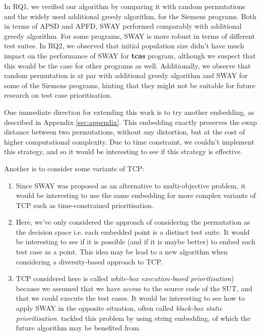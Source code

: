 \documentclass[10pt,journal,compsoc]{IEEEtran}
\begin{document}
	In RQ1, we verified our algorithm by comparing it with random permutations and the widely used additional greedy algorithm, for the Siemens programs. Both in terms of APSD and APFD, SWAY performed comparably with additional greedy algorithm. For some programs, SWAY is more robust in terms of different test suites.
	In RQ2, we observed that initial population size didn't have much impact on the performance of SWAY for {\bf tcas} program, although we suspect that this would be the case for other programs as well.
	Additionally, we observe that random permutation is at par with additional greedy algorithm and SWAY for some of the Siemens programs, hinting that they might not be suitable for future research on test case prioritisation.
	
	One immediate direction for extending this work is to try another embedding, as described in Appendix \ref{sec:appendix}.
	This embedding exactly preserves the swap distance between two permutations, without any distortion, but at the cost of higher computational complexity.
	Due to time constraint, we couldn't implement this strategy, and so it would be interesting to see if this strategy is effective.
	
	Another is to consider some variants of TCP:
	\begin{enumerate}
		\item Since SWAY was proposed as an alternative to multi-objective problem, it would be interesting to use the same embedding for more complex variants of TCP such as time-constrained prioritisation\cite{JP02, DMTR10}.
		
		\item Here, we've only considered the approach of considering the permutation as the decision space i.e. each embedded point is a distinct test suite.
		It would be interesting to see if it is possible (and if it is maybe better) to embed each test case as a point.
		This idea may be lead to a new algorithm when considering a diversity-based approach to TCP.
		
		\item TCP considered here is called {\it white-box execution-based prioritisation})\cite{THHBD14} because we assumed that we have access to the source code of the SUT, and that we could execute the test cases.
		It would be interesting to see how to apply SWAY in the opposite situation, often called {\it black-box static prioritisation}.
		\cite{LPBS09, LPBMN12, THHBD14} tackled this problem by using string embedding, of which the future algorithm may be benefited from.
	\end{enumerate}
	
\end{document}
